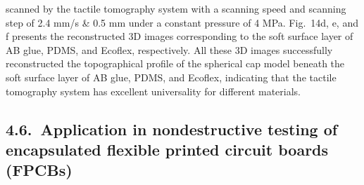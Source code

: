 \documentclass[11pt]{article}
\begin{document}
scanned by the tactile tomography system with a scanning speed and
scanning step of 2.4 mm/s \& 0.5 mm under a constant pressure of 4
MPa. Fig.~14d, e, and f presents the reconstructed 3D images
corresponding to the soft surface layer of AB glue, PDMS, and
Ecoflex, respectively. All these 3D images successfully
reconstructed the topographical profile of the spherical cap model
beneath the soft surface layer of AB glue, PDMS, and Ecoflex,
indicating that the tactile tomography system has excellent
universality for different materials.

\subsection*{4.6.\ Application in nondestructive testing of encapsulated flexible printed circuit boards (FPCBs)}
\end{document}
